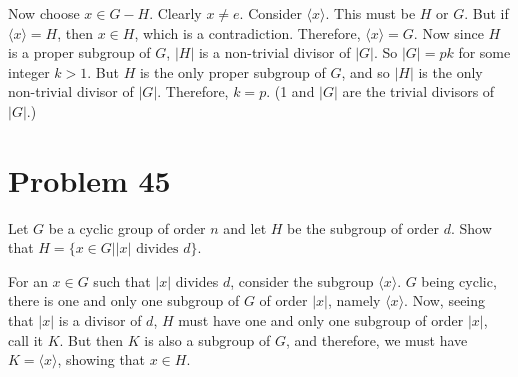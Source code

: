\documentclass[12pt]{article}
\begin{document}
Now choose $x\in G-H$.  Clearly $x\neq e$.  Consider $\langle x\rangle$.
This must be $H$ or $G$.  But if $\langle x\rangle=H$, then $x\in H$, which is
a contradiction.  Therefore, $\langle x\rangle=G$.  Now since $H$ is a
proper subgroup of $G$, $|H|$ is a non-trivial divisor of $|G|$.
So $|G|=pk$ for some integer $k>1$.  But $H$ is the only proper
subgroup of $G$, and so $|H|$ is the only non-trivial divisor of $|G|$.
Therefore, $k=p$.  (1 and $|G|$ are the trivial divisors of $|G|$.)

\section*{Problem 45}

Let $G$ be a cyclic group of order $n$ and let $H$ be the subgroup of order $d$.
Show that $H=\{x\in G|\mbox{$|x|$ divides $d$}\}$.

For an $x\in G$ such that $|x|$ divides $d$, consider the subgroup $\langle x\rangle$.
$G$ being cyclic, there is one and only one subgroup of $G$ of order $|x|$, namely $\langle x\rangle$.
Now, seeing that $|x|$ is a divisor of $d$, $H$ must have one and only one subgroup of order $|x|$,
call it $K$.  But then $K$ is also a subgroup of $G$, and therefore, we must have $K=\langle x\rangle$,
showing that $x\in H$.
\end{document}
